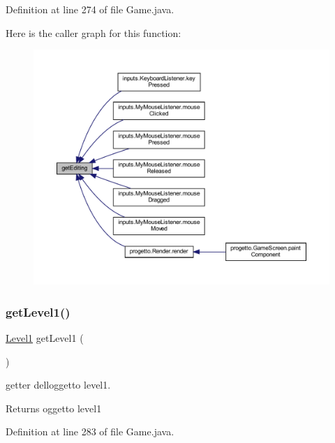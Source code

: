 Definition at line 274 of file Game.\+java.

Here is the caller graph for this function\+:\nopagebreak
\begin{figure}[H]
\begin{center}
\leavevmode
\includegraphics[width=350pt]{classprogetto_1_1_game_a0f1448e932e53b14606a448017e76c6c_icgraph}
\end{center}
\end{figure}
\mbox{\label{classprogetto_1_1_game_a6991f76e58df8f4b9bc8e94e3389d150}} 
\subsubsection{\texorpdfstring{get\+Level1()}{getLevel1()}}
{\footnotesize\ttfamily \hyperlink{classscenes_1_1_level1}{Level1} get\+Level1 (\begin{DoxyParamCaption}{ }\end{DoxyParamCaption})}



getter dell\textquotesingle{}oggetto level1. 

\begin{DoxyReturn}{Returns}
oggetto level1 
\end{DoxyReturn}


Definition at line 283 of file Game.\+java.

